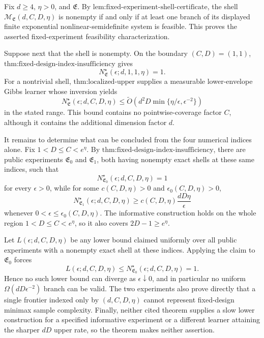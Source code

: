 Fix \(d\ge4\), \(\eta>0\), and \(\mathfrak E\). By \(\text{lem:fixed-experiment-shell-certificate}\), the shell \(\mathcal M_{\mathfrak E}(d,C,D,\eta)\) is nonempty if and only if at least one branch of its displayed finite exponential nonlinear-semidefinite system is feasible. This proves the asserted fixed-experiment feasibility characterization.

Suppose next that the shell is nonempty. On the boundary \((C,D)=(1,1)\), \(\text{thm:fixed-design-index-insufficiency}\) gives
\[
N^\star_{\mathfrak E}(\epsilon;d,1,1,\eta)=1.
\]
For a nontrivial shell, \(\text{thm:localized-upper}\) supplies a measurable lower-envelope Gibbs learner whose inversion yields
\[
N^\star_{\mathfrak E}(\epsilon;d,C,D,\eta)
\le\widetilde O\!\left(d^2D\min\{\eta/\epsilon,\epsilon^{-2}\}\right)
\]
in the stated range. This bound contains no pointwise-coverage factor \(C\), although it contains the additional dimension factor \(d\).

It remains to determine what can be concluded from the four numerical indices alone. Fix \(1<D\le C<e^\eta\). By \(\text{thm:fixed-design-index-insufficiency}\), there are public experiments \(\mathfrak E_0\) and \(\mathfrak E_1\), both having nonempty exact shells at these same indices, such that
\[
N^\star_{\mathfrak E_0}(\epsilon;d,C,D,\eta)=1
\]
for every \(\epsilon>0\), while for some \(c(C,D,\eta)>0\) and \(\epsilon_0(C,D,\eta)>0\),
\[
N^\star_{\mathfrak E_1}(\epsilon;d,C,D,\eta)
\ge c(C,D,\eta)\frac{dD\eta}{\epsilon}
\]
whenever \(0<\epsilon\le\epsilon_0(C,D,\eta)\). The informative construction holds on the whole region \(1<D\le C<e^\eta\), so it also covers \(2D-1\ge e^\eta\).

Let \(L(\epsilon;d,C,D,\eta)\) be any lower bound claimed uniformly over all public experiments with a nonempty exact shell at these indices. Applying the claim to \(\mathfrak E_0\) forces
\[
L(\epsilon;d,C,D,\eta)
\le N^\star_{\mathfrak E_0}(\epsilon;d,C,D,\eta)=1.
\]
Hence no such lower bound can diverge as \(\epsilon\downarrow0\), and in particular no uniform \(\Omega(dD\epsilon^{-2})\) branch can be valid. The two experiments also prove directly that a single frontier indexed only by \((d,C,D,\eta)\) cannot represent fixed-design minimax sample complexity. Finally, neither cited theorem supplies a slow lower construction for a specified informative experiment or a different learner attaining the sharper \(dD\) upper rate, so the theorem makes neither assertion.